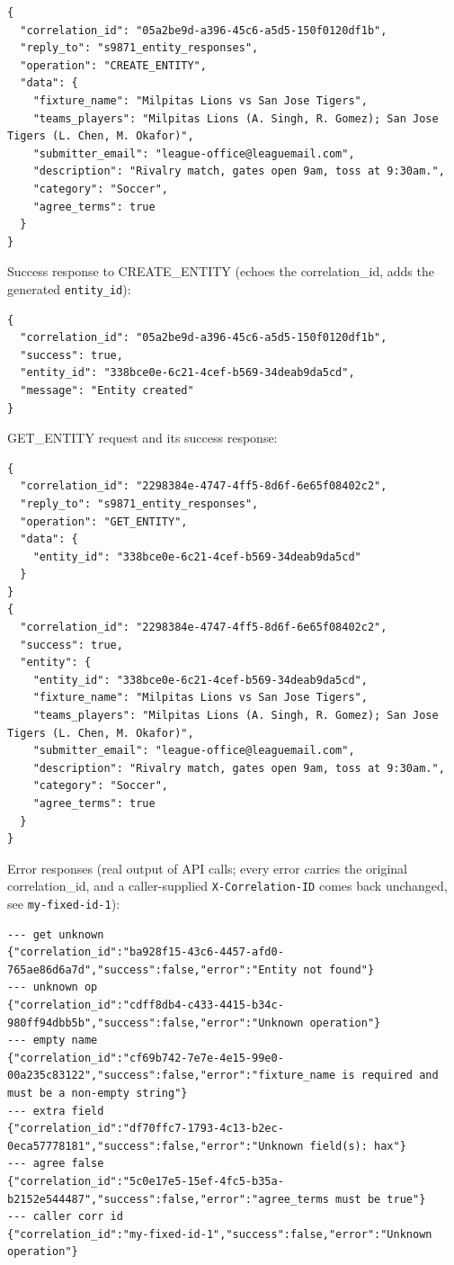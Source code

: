 \documentclass[11pt]{article}
\begin{document}
\begingroup\lstset{basicstyle=\ttfamily\scriptsize}
\begin{lstlisting}
{
  "correlation_id": "05a2be9d-a396-45c6-a5d5-150f0120df1b",
  "reply_to": "s9871_entity_responses",
  "operation": "CREATE_ENTITY",
  "data": {
    "fixture_name": "Milpitas Lions vs San Jose Tigers",
    "teams_players": "Milpitas Lions (A. Singh, R. Gomez); San Jose Tigers (L. Chen, M. Okafor)",
    "submitter_email": "league-office@leaguemail.com",
    "description": "Rivalry match, gates open 9am, toss at 9:30am.",
    "category": "Soccer",
    "agree_terms": true
  }
}
\end{lstlisting}
\endgroup
Success response to CREATE\_ENTITY (echoes the correlation\_id, adds the generated \texttt{entity\_\allowbreak{}id}):

\begingroup\lstset{basicstyle=\ttfamily\scriptsize}
\begin{lstlisting}
{
  "correlation_id": "05a2be9d-a396-45c6-a5d5-150f0120df1b",
  "success": true,
  "entity_id": "338bce0e-6c21-4cef-b569-34deab9da5cd",
  "message": "Entity created"
}
\end{lstlisting}
\endgroup
GET\_ENTITY request and its success response:

\begingroup\lstset{basicstyle=\ttfamily\scriptsize}
\begin{lstlisting}
{
  "correlation_id": "2298384e-4747-4ff5-8d6f-6e65f08402c2",
  "reply_to": "s9871_entity_responses",
  "operation": "GET_ENTITY",
  "data": {
    "entity_id": "338bce0e-6c21-4cef-b569-34deab9da5cd"
  }
}
{
  "correlation_id": "2298384e-4747-4ff5-8d6f-6e65f08402c2",
  "success": true,
  "entity": {
    "entity_id": "338bce0e-6c21-4cef-b569-34deab9da5cd",
    "fixture_name": "Milpitas Lions vs San Jose Tigers",
    "teams_players": "Milpitas Lions (A. Singh, R. Gomez); San Jose Tigers (L. Chen, M. Okafor)",
    "submitter_email": "league-office@leaguemail.com",
    "description": "Rivalry match, gates open 9am, toss at 9:30am.",
    "category": "Soccer",
    "agree_terms": true
  }
}
\end{lstlisting}
\endgroup
Error responses (real output of API calls; every error carries the original correlation\_id, and a caller-supplied \texttt{X-Correlation-ID} comes back unchanged, see \texttt{my-fixed-id-1}):

\begingroup\lstset{basicstyle=\ttfamily\tiny}
\begin{lstlisting}
--- get unknown
{"correlation_id":"ba928f15-43c6-4457-afd0-765ae86d6a7d","success":false,"error":"Entity not found"}
--- unknown op
{"correlation_id":"cdff8db4-c433-4415-b34c-980ff94dbb5b","success":false,"error":"Unknown operation"}
--- empty name
{"correlation_id":"cf69b742-7e7e-4e15-99e0-00a235c83122","success":false,"error":"fixture_name is required and must be a non-empty string"}
--- extra field
{"correlation_id":"df70ffc7-1793-4c13-b2ec-0eca57778181","success":false,"error":"Unknown field(s): hax"}
--- agree false
{"correlation_id":"5c0e17e5-15ef-4fc5-b35a-b2152e544487","success":false,"error":"agree_terms must be true"}
--- caller corr id
{"correlation_id":"my-fixed-id-1","success":false,"error":"Unknown operation"}
\end{lstlisting}
\endgroup
\end{document}
